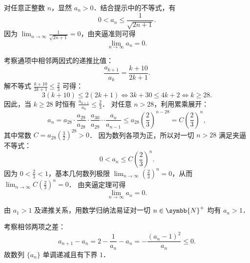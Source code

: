 \begin{solution}

    对任意正整数 $n$，显然 $a_n > 0$．结合提示中的不等式，有
    \begin{equation}
        0 < a_n \leqslant \frac{1}{\sqrt{2n+1}}.
    \end{equation}
    因为 $\lim_{n\to\infty} \frac{1}{\sqrt{2n+1}} = 0$，由夹逼准则可得
    \begin{equation}
        \boxed{\lim_{n\to\infty} a_n = 0.}
    \end{equation}


    考察通项中相邻两因式的递推比值：
    \begin{equation}
        \frac{a_{k+1}}{a_k} = \frac{k+10}{2k+1}.
    \end{equation}
    解不等式 $\frac{k+10}{2k+1} \leqslant \frac{2}{3}$ 可得：
    \begin{equation}
        3(k + 10) \leqslant 2(2k + 1) \iff 3k + 30 \leqslant 4k + 2 \iff k \geqslant 28.
    \end{equation}
    因此，当 $k \geqslant 28$ 时恒有 $\frac{a_{k+1}}{a_k} \leqslant \frac{2}{3}$．
    对任意 $n > 28$，利用累乘展开：
    \begin{equation}
        a_n = a_{28} \cdot \frac{a_{29}}{a_{28}} \cdot \frac{a_{30}}{a_{29}} \cdots \frac{a_n}{a_{n-1}} \leqslant a_{28} \left( \frac{2}{3} \right)^{n - 28} = C \left( \frac{2}{3} \right)^n,
    \end{equation}
    其中常数 $C = a_{28} \left(\frac{3}{2}\right)^{28} > 0$．
    因为数列各项为正，所以对一切 $n > 28$ 满足夹逼不等式：
    \begin{equation}
        0 < a_n \leqslant C \left( \frac{2}{3} \right)^n.
    \end{equation}
    因为 $0 < \frac{2}{3} < 1$，基本几何数列极限 $\lim_{n\to\infty} \left( \frac{2}{3} \right)^n = 0$，从而 $\lim_{n\to\infty} C \left( \frac{2}{3} \right)^n = 0$．
    由夹逼定理可得
    \begin{equation}
        \lim_{n\to\infty} a_n = 0.
    \end{equation}


    由 $a_1 > 1$ 及递推关系，用数学归纳法易证对一切 $n \in \symbb{N}^+$ 均有 $a_n > 1$．

    考察相邻两项之差：
    \begin{equation}
        a_{n+1} - a_n = 2 - \frac{1}{a_n} - a_n = -\frac{(a_n - 1)^2}{a_n} \leqslant 0.
    \end{equation}
    故数列 $\{a_n\}$ 单调递减且有下界 $1$．


\end{solution}
